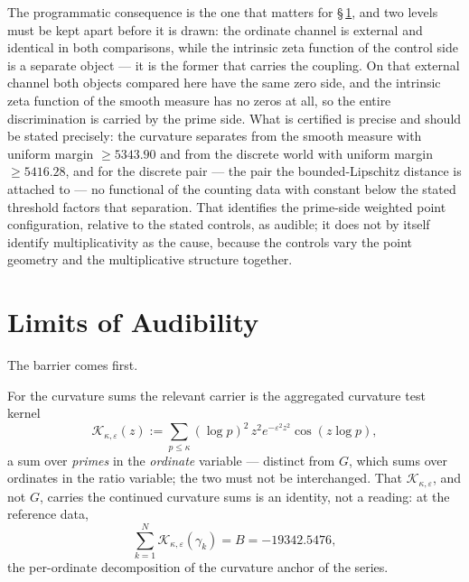 \documentclass[11pt]{article}
\begin{document}
The programmatic consequence is the one that matters for
\S\,\ref{sec:audibility}, and two levels must be kept apart before it is
drawn: the ordinate channel is external and identical in both comparisons,
while the intrinsic zeta function of the control side is a separate object ---
it is the former that carries the coupling. On that external channel both
objects compared here have the same zero side, and the intrinsic zeta
function of the smooth measure has no zeros at all, so the entire
discrimination is carried by the prime side. What is certified is precise and
should be stated precisely: the curvature separates from the smooth measure
with uniform margin $\ge5343.90$ and from the discrete world with uniform
margin $\ge5416.28$, and for the discrete pair --- the pair the
bounded-Lipschitz distance is attached to --- no functional of the counting
data with constant below the stated threshold factors that separation. That
identifies the prime-side weighted point configuration, relative to the
stated controls, as audible; it does not by itself identify multiplicativity
as the cause, because the controls vary the point geometry and the
multiplicative structure together.

\section{Limits of Audibility}
\label{sec:audibility}

The barrier comes first.

For the curvature sums the relevant carrier is the aggregated curvature
test kernel
\[
\mathcal K_{\kappa,\varepsilon}(z)
:=\sum_{p\le\kappa}(\log p)^2\,z^2 e^{-\varepsilon^2z^2}\cos(z\log p),
\]
a sum over \emph{primes} in the \emph{ordinate} variable --- distinct from
$G$, which sums over ordinates in the ratio variable; the two must not be
interchanged. That $\mathcal K_{\kappa,\varepsilon}$, and not $G$, carries
the continued curvature sums is an identity, not a reading: at the reference
data,
\[
\sum_{k=1}^{N}\mathcal K_{\kappa,\varepsilon}(\gamma_k)=B=-19342.5476,
\]
the per-ordinate decomposition of the curvature anchor of the series.
\end{document}
